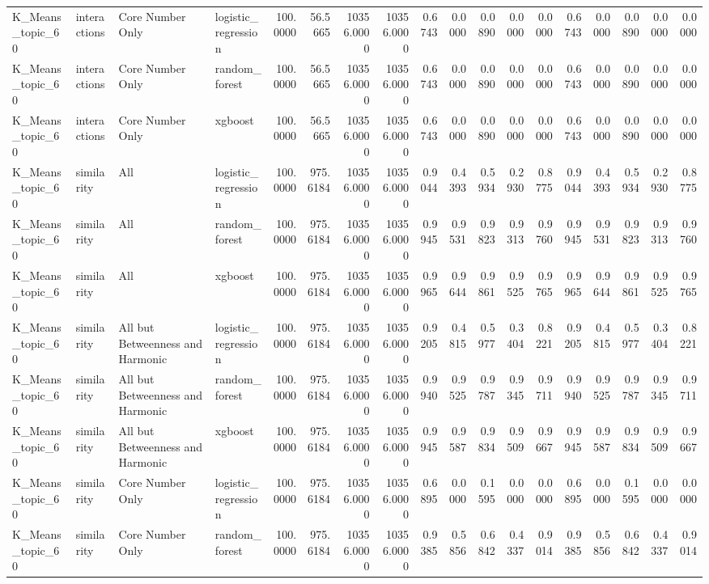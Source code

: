 \begin{tabular}{llllrrrrrrrrrrrrrr}
K_Means_topic_60 & interactions & Core Number Only & logistic_regression & 100.0000 & 56.5665 & 10356.0000 & 10356.0000 & 0.6743 & 0.0000 & 0.0890 & 0.0000 & 0.0000 & 0.6743 & 0.0000 & 0.0890 & 0.0000 & 0.0000 \\
K_Means_topic_60 & interactions & Core Number Only & random_forest & 100.0000 & 56.5665 & 10356.0000 & 10356.0000 & 0.6743 & 0.0000 & 0.0890 & 0.0000 & 0.0000 & 0.6743 & 0.0000 & 0.0890 & 0.0000 & 0.0000 \\
K_Means_topic_60 & interactions & Core Number Only & xgboost & 100.0000 & 56.5665 & 10356.0000 & 10356.0000 & 0.6743 & 0.0000 & 0.0890 & 0.0000 & 0.0000 & 0.6743 & 0.0000 & 0.0890 & 0.0000 & 0.0000 \\
K_Means_topic_60 & similarity & All & logistic_regression & 100.0000 & 975.6184 & 10356.0000 & 10356.0000 & 0.9044 & 0.4393 & 0.5934 & 0.2930 & 0.8775 & 0.9044 & 0.4393 & 0.5934 & 0.2930 & 0.8775 \\
K_Means_topic_60 & similarity & All & random_forest & 100.0000 & 975.6184 & 10356.0000 & 10356.0000 & 0.9945 & 0.9531 & 0.9823 & 0.9313 & 0.9760 & 0.9945 & 0.9531 & 0.9823 & 0.9313 & 0.9760 \\
K_Means_topic_60 & similarity & All & xgboost & 100.0000 & 975.6184 & 10356.0000 & 10356.0000 & 0.9965 & 0.9644 & 0.9861 & 0.9525 & 0.9765 & 0.9965 & 0.9644 & 0.9861 & 0.9525 & 0.9765 \\
K_Means_topic_60 & similarity & All but Betweenness and Harmonic & logistic_regression & 100.0000 & 975.6184 & 10356.0000 & 10356.0000 & 0.9205 & 0.4815 & 0.5977 & 0.3404 & 0.8221 & 0.9205 & 0.4815 & 0.5977 & 0.3404 & 0.8221 \\
K_Means_topic_60 & similarity & All but Betweenness and Harmonic & random_forest & 100.0000 & 975.6184 & 10356.0000 & 10356.0000 & 0.9940 & 0.9525 & 0.9787 & 0.9345 & 0.9711 & 0.9940 & 0.9525 & 0.9787 & 0.9345 & 0.9711 \\
K_Means_topic_60 & similarity & All but Betweenness and Harmonic & xgboost & 100.0000 & 975.6184 & 10356.0000 & 10356.0000 & 0.9945 & 0.9587 & 0.9834 & 0.9509 & 0.9667 & 0.9945 & 0.9587 & 0.9834 & 0.9509 & 0.9667 \\
K_Means_topic_60 & similarity & Core Number Only & logistic_regression & 100.0000 & 975.6184 & 10356.0000 & 10356.0000 & 0.6895 & 0.0000 & 0.1595 & 0.0000 & 0.0000 & 0.6895 & 0.0000 & 0.1595 & 0.0000 & 0.0000 \\
K_Means_topic_60 & similarity & Core Number Only & random_forest & 100.0000 & 975.6184 & 10356.0000 & 10356.0000 & 0.9385 & 0.5856 & 0.6842 & 0.4337 & 0.9014 & 0.9385 & 0.5856 & 0.6842 & 0.4337 & 0.9014 \\

\end{tabular}
